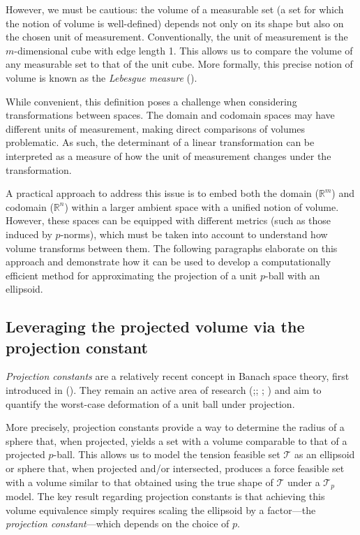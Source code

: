 However, we must be cautious: the volume of a measurable set (a set for which the notion of volume is well-defined) depends not only on its shape but also on the chosen unit of measurement.  Conventionally, the unit of measurement is the $m$-dimensional cube with edge length 1.  This allows us to compare the volume of any measurable set to that of the unit cube.  More formally, this precise notion of volume is known as the \emph{Lebesgue measure} (\cite{lebesgueIntegraleLongueurAire1902}).

While convenient, this definition poses a challenge when considering transformations between spaces. The domain and codomain spaces may have different units of measurement, making direct comparisons of volumes problematic. As such, the determinant of a linear transformation can be interpreted as a measure of how the unit of measurement changes under the transformation.

A practical approach to address this issue is to embed both the domain ($\mathbb{R}^m$) and codomain ($\mathbb{R}^n$) within a larger ambient space with a unified notion of volume. However, these spaces can be equipped with different metrics (such as those induced by $p$-norms), which must be taken into account to understand how volume transforms between them.  The following paragraphs elaborate on this approach and demonstrate how it can be used to develop a computationally efficient method for approximating the projection of a unit $p$-ball with an ellipsoid.

\subsection{Leveraging the projected volume via the projection constant}
\label{subsec:projection_constant}
\emph{Projection constants} are a relatively recent concept in Banach space theory, first introduced in (\cite{murrayCOMPLEMENTARYMANIFOLDSPRO}). They remain an active area of research (\cite{donohoCountingFacesRandomlyProjected2010};\cite{foucartMaximalRelativeProjection2017}; \cite{bassoComputationMaximalProjection2019}; \cite{defantProjectionConstantsSpaces2022}) and aim to quantify the worst-case deformation of a unit ball under projection. 

More precisely, projection constants provide a way to determine the radius of a sphere that, when projected, yields a set with a volume comparable to that of a projected $p$-ball. This allows us to model the tension feasible set $\mathcal{T}$ as an ellipsoid or sphere that, when projected and/or intersected, produces a force feasible set with a volume similar to that obtained using the true shape of $\mathcal{T}$ under a $\mathcal{T}_p$ model. The key result regarding projection constants is that achieving this volume equivalence simply requires scaling the ellipsoid by a factor—the \emph{projection constant}—which depends on the choice of $p$.

